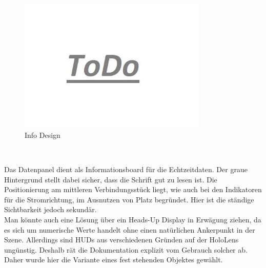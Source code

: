 \begin{figure}[h!]
	\centering
	\includegraphics[width=0.8\textwidth]{images/todo.jpg}
	\caption{Info Design}
	\label{img:info-design}
\end{figure}

\vspace{8px}
\begin{center}
	\\
\end{center}
\vspace{6px}

Das Datenpanel dient als Informationsboard für die Echtzeitdaten. Der graue Hintergrund stellt dabei sicher, dass die Schrift gut zu lesen ist. Die Positionierung am mittleren Verbindungsstück liegt, wie auch bei den Indikatoren für die Stromrichtung, im Ausnutzen von Platz begründet. Hier ist die ständige Sichtbarkeit jedoch sekundär.\\

Man könnte auch eine Lösung über ein Heads-Up Display in Erwägung ziehen, da es sich um numerische Werte handelt ohne einen natürlichen Ankerpunkt in der Szene. Allerdings sind HUDs aus verschiedenen Gründen auf der HoloLens ungünstig. Deshalb rät die Dokumentation explizit vom Gebrauch solcher ab. Daher wurde hier die Variante eines fest stehenden Objektes gewählt.\\

